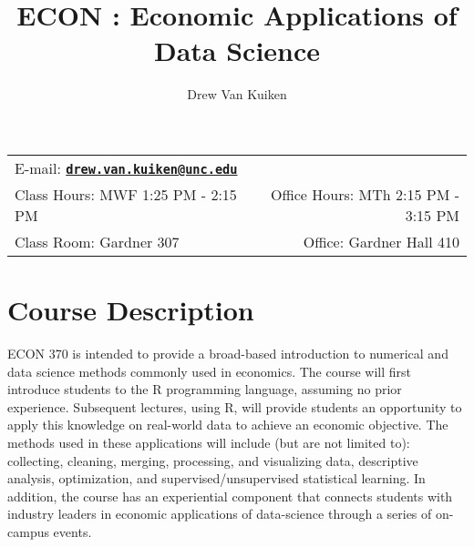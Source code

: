 \documentclass[11pt]{article}
\title{ECON \CourseNum: Economic Applications of Data Science} %
\author{Drew Van Kuiken}                                            %
\date{\SemSeason \SemYear}                                     %
\newcommand{\CourseNum}{370\xspace}         %
\begin{document}
\maketitle

\begin{tabular*}{\textwidth}{@{\extracolsep{\fill}}lr}

E-mail: \href{mailto:drew.van.kuiken@unc.edu}{\tt\bf drew.van.kuiken@unc.edu} \\

Class Hours: MWF 1:25 PM - 2:15 PM & Office Hours: MTh 2:15 PM - 3:15 PM \\

Class Room: Gardner 307 & Office: Gardner Hall 410 \\
\hline
\end{tabular*}
\vspace{2 mm}

\section*{Course Description}
ECON \CourseNum is intended to provide a broad-based introduction to numerical and data science methods commonly used in economics. The course will first introduce students to the R programming language, assuming no prior experience. Subsequent lectures, using R, will provide students an opportunity to apply this knowledge on real-world data to achieve an economic objective.  The methods used in these applications will include (but are not limited to): collecting, cleaning, merging, processing, and visualizing data, descriptive analysis, optimization, and supervised/unsupervised statistical learning. In addition, the course has an experiential component that connects students with industry leaders in economic applications of data-science through a series of on-campus events.


\end{document}
